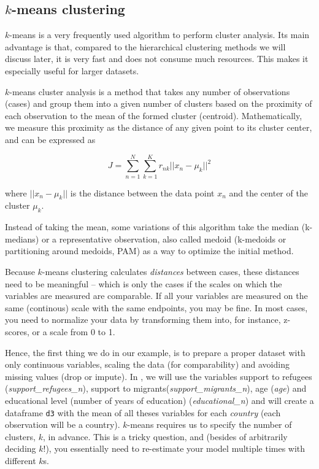 \subsection{$k$-means clustering}

$k$-means is a very frequently used algorithm to perform cluster
analysis. Its main advantage is that, compared to the hierarchical
clustering methods we will discuss later, it is very fast and does not
consume much resources. This makes it especially useful for larger
datasets.

$k$-means cluster analysis is a method that takes any number of observations (cases) and group them into a given number of clusters based on the proximity of each observation to the mean of the formed cluster (centroid).  Mathematically, we measure this proximity as the distance of any given point to its cluster center, and can be expressed as

$$J = \sum_{n=1}^{N} \sum_{k=1}^{K} r_{nk} ||x_n - \mu_k||^2$$

where $ ||x_n - \mu_k||$ is the distance between the data point $x_n$ and the center of the cluster $\mu_k$.

Instead of taking the mean, some variations of this algorithm take the median (k-medians) or a representative observation, also called medoid (k-medoids or partitioning around medoids, PAM) as a way to optimize the initial method.

Because $k$-means clustering calculates \emph{distances} between cases,
these distances need to be meaningful -- which is only the cases if
the scales on which the variables are measured are comparable. If all
your variables are measured on the same (continous) scale with the
same endpoints, you may be fine. In most cases, you need to normalize
your data by transforming them into, for instance, z-scores, or a
scale from 0 to 1.

Hence, the first thing we do in our example, is to prepare a proper
dataset with only continuous variables, scaling the data (for
comparability) and avoiding missing values (drop or impute). In
, we will use the variables support to refugees
(\emph{support\_refugees\_n}), support to
migrants(\emph{support\_migrants\_n}), age (\emph{age}) and
educational level (number of years of education)
(\emph{educational\_n}) and will create a dataframe \verb+d3+ with the
mean of all theses variables for each \emph{country} (each observation
will be a country). $k$-means requires us to specify the number of
clusters, $k$, in advance. This is a tricky question, and (besides of
arbitrarily deciding $k$!), you essentially need to re-estimate your
model multiple times with different $k$s.

